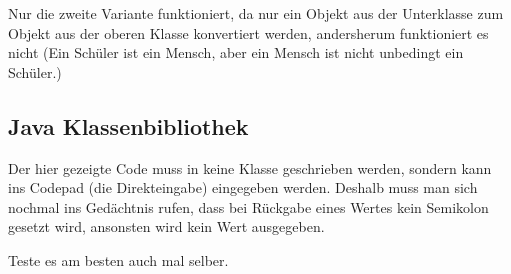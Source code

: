 \documentclass{scrartcl}   %
\begin{document}
Nur die zweite Variante funktioniert, da nur ein Objekt aus der Unterklasse zum Objekt aus der oberen Klasse konvertiert werden, andersherum funktioniert es nicht (\glqq Ein Schüler ist ein Mensch, aber ein Mensch ist nicht unbedingt ein Schüler.\grqq)

\newpage

\subsection{Java Klassenbibliothek}

Der hier gezeigte Code muss in keine Klasse geschrieben werden, sondern kann ins Codepad (die Direkteingabe) eingegeben werden. Deshalb muss man sich nochmal ins Gedächtnis rufen, dass bei Rückgabe eines Wertes kein Semikolon gesetzt wird, ansonsten wird kein Wert ausgegeben.

Teste es am besten auch mal selber.
\end{document}
